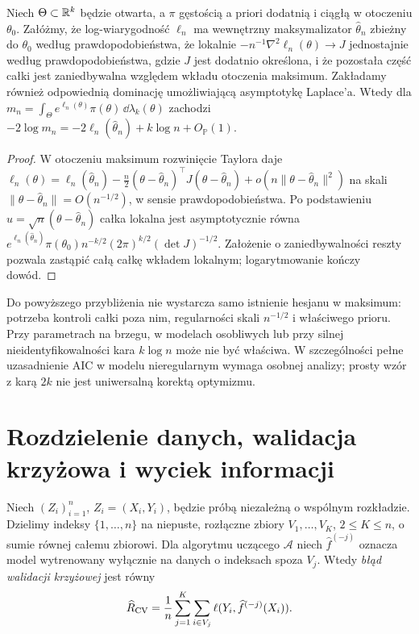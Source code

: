 \begin{stwierdzenie}
\label{prop:bic-laplace}
Niech $\Theta\subset\mathbb R^k$ będzie otwarta, a $\pi$
gęstością a priori dodatnią i ciągłą w otoczeniu
$\theta_0$. Załóżmy, że log-wiarygodność $\ell_n$
ma wewnętrzny maksymalizator $\widehat\theta_n$ zbieżny do
$\theta_0$ według prawdopodobieństwa, że lokalnie
$-n^{-1}\nabla^2\ell_n(\theta)\to J$ jednostajnie według
prawdopodobieństwa, gdzie $J$ jest dodatnio określona,
i że pozostała część całki jest zaniedbywalna względem
wkładu otoczenia maksimum. Zakładamy również
odpowiednią dominację umożliwiającą asymptotykę Laplace'a.
Wtedy dla $m_n=\int_\Theta e^{\ell_n(\theta)}\pi(\theta)
\,\dd\lambda_k(\theta)$ zachodzi
$-2\log m_n=-2\ell_n(\widehat\theta_n)+k\log n
+O_{\mathbb P}(1)$.
\end{stwierdzenie}
\begin{proof}
W otoczeniu maksimum rozwinięcie Taylora daje
$\ell_n(\theta)=\ell_n(\widehat\theta_n)-\tfrac n2
(\theta-\widehat\theta_n)^\top J
(\theta-\widehat\theta_n)+o(n\|\theta-\widehat\theta_n\|^2)$
na skali $\|\theta-\widehat\theta_n\|=O(n^{-1/2})$,
w sensie prawdopodobieństwa.
Po podstawieniu $u=\sqrt n(\theta-\widehat\theta_n)$
całka lokalna jest asymptotycznie równa
$e^{\ell_n(\widehat\theta_n)}\pi(\theta_0)n^{-k/2}
(2\pi)^{k/2}(\det J)^{-1/2}$.
Założenie o zaniedbywalności reszty pozwala zastąpić
całą całkę wkładem lokalnym; logarytmowanie kończy dowód.
\end{proof}

\begin{uwaga}
Do powyższego przybliżenia nie wystarcza samo istnienie
hesjanu w maksimum: potrzeba kontroli całki poza nim,
regularności skali $n^{-1/2}$ i właściwego prioru.
Przy parametrach na brzegu, w modelach osobliwych
lub przy silnej nieidentyfikowalności kara $k\log n$
może nie być właściwa. W szczególności pełne
uzasadnienie AIC w modelu nieregularnym wymaga
osobnej analizy; prosty wzór z karą $2k$ nie jest
uniwersalną korektą optymizmu.
\end{uwaga}

\section{Rozdzielenie danych, walidacja krzyżowa i wyciek informacji}
\begin{definicja}
Niech $(Z_i)_{i=1}^n$, $Z_i=(X_i,Y_i)$, będzie próbą
niezależną o wspólnym rozkładzie. Dzielimy indeksy
$\{1,\ldots,n\}$ na niepuste, rozłączne zbiory
$V_1,\ldots,V_K$, $2\le K\le n$, o sumie równej
całemu zbiorowi. Dla algorytmu uczącego $\mathcal A$
niech $\widehat f^{(-j)}$ oznacza model wytrenowany
wyłącznie na danych o indeksach spoza $V_j$.
Wtedy \emph{błąd walidacji krzyżowej} jest równy
\[
 \widehat R_{\rm CV}=
 \frac1n\sum_{j=1}^K\sum_{i\in V_j}
 \ell(Y_i,\widehat f^{(-j)}(X_i)).
\]
\end{definicja}


